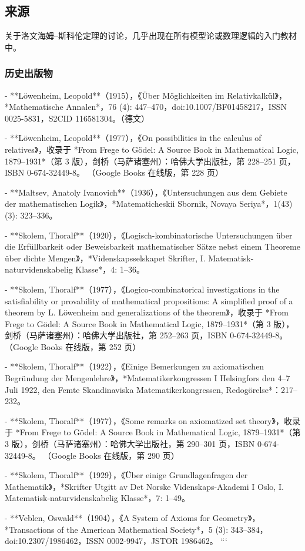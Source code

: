 \subsection{来源}
关于洛文海姆–斯科伦定理的讨论，几乎出现在所有模型论或数理逻辑的入门教材中。
\subsubsection{历史出版物}
- **Löwenheim, Leopold**（1915），《Über Möglichkeiten im Relativkalkül》，*Mathematische Annalen*，76 (4): 447–470，doi:10.1007/BF01458217，ISSN 0025-5831，S2CID 116581304。（德文）

- **Löwenheim, Leopold**（1977），《On possibilities in the calculus of relatives》，收录于 *From Frege to Gödel: A Source Book in Mathematical Logic, 1879–1931*（第 3 版），剑桥（马萨诸塞州）：哈佛大学出版社，第 228–251 页，ISBN 0-674-32449-8。  
  （Google Books 在线版，第 228 页）

- **Maltsev, Anatoly Ivanovich**（1936），《Untersuchungen aus dem Gebiete der mathematischen Logik》，*Matematicheskii Sbornik, Novaya Seriya*，1(43)(3): 323–336。

- **Skolem, Thoralf**（1920），《Logisch-kombinatorische Untersuchungen über die Erfüllbarkeit oder Beweisbarkeit mathematischer Sätze nebst einem Theoreme über dichte Mengen》，*Videnskapsselskapet Skrifter, I. Matematisk-naturvidenskabelig Klasse*，4: 1–36。

- **Skolem, Thoralf**（1977），《Logico-combinatorical investigations in the satisfiability or provability of mathematical propositions: A simplified proof of a theorem by L. Löwenheim and generalizations of the theorem》，收录于 *From Frege to Gödel: A Source Book in Mathematical Logic, 1879–1931*（第 3 版），剑桥（马萨诸塞州）：哈佛大学出版社，第 252–263 页，ISBN 0-674-32449-8。  
  （Google Books 在线版，第 252 页）

- **Skolem, Thoralf**（1922），《Einige Bemerkungen zu axiomatischen Begründung der Mengenlehre》，*Matematikerkongressen I Helsingfors den 4–7 Juli 1922, den Femte Skandinaviska Matematikerkongressen, Redogörelse*：217–232。

- **Skolem, Thoralf**（1977），《Some remarks on axiomatized set theory》，收录于 *From Frege to Gödel: A Source Book in Mathematical Logic, 1879–1931*（第 3 版），剑桥（马萨诸塞州）：哈佛大学出版社，第 290–301 页，ISBN 0-674-32449-8。  
  （Google Books 在线版，第 290 页）

- **Skolem, Thoralf**（1929），《Über einige Grundlagenfragen der Mathematik》，*Skrifter Utgitt av Det Norske Videnskaps-Akademi I Oslo, I. Matematisk-naturvidenskabelig Klasse*，7: 1–49。

- **Veblen, Oswald**（1904），《A System of Axioms for Geometry》，*Transactions of the American Mathematical Society*，5 (3): 343–384，doi:10.2307/1986462，ISSN 0002-9947，JSTOR 1986462。
```
